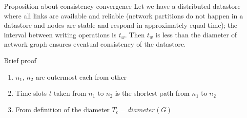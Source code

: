 \documentclass[aspectratio=43]{beamer}
\begin{document}
\begin{frame}{Proposition about consistency convergence}
Let we have a distributed datastore where all links are available and reliable (network partitions do not happen in a datastore and nodes are stable and respond in approximately equal time); the interval between writing operations is $t_w$.
Then $t_w$ is less than the diameter of network graph ensures eventual consistency of the datastore.
\begin{block}{Brief proof}
\begin{enumerate}
\item $n_1$, $n_2$ are outermost each from other
\item Time slots $t$ taken from $n_1$ to $n_2$ is the shortest path from $n_1$ to $n_2$
\item From definition of the diameter $T_c = diameter(G)$
\end{enumerate}
\end{block}
\end{frame}
\end{document}
